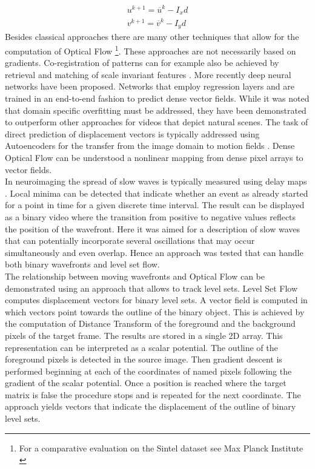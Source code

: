 \begin{equation}
  \begin{array}{l}
    u^{k+1}=\overline{u}^k - I_x d \\
    v^{k+1}=\overline{v}^k - I_y d
  \end{array}
\label{eqn:iterative_scheme}
\end{equation}
Besides classical approaches there are many other techniques that allow for the computation of Optical Flow \footnote{For a comparative evaluation on the Sintel dataset see Max Planck Institute \parencite*{mpi2020sintel}}. These approaches are not necessarily based on gradients. Co-registration of patterns can for example also be achieved by retrieval and matching of scale invariant features \parencite{zhang2014scale}. More recently deep neural networks have been proposed. Networks that employ regression layers and are trained in an end-to-end fashion to predict dense vector fields. While it was noted that domain specific overfitting must be addressed, they have been demonstrated to outperform other approaches for videos that depict natural scenes. The task of direct prediction of displacement vectors is typically addressed using Autoencoders for the transfer from the image domain to motion fields \parencite{hur2020optical}. Dense Optical Flow can be understood a nonlinear mapping from dense pixel arrays to vector fields. \\
In neuroimaging the spread of slow waves is typically measured using delay maps \parencite{celotto2020analysis}. Local minima can be detected that indicate whether an event as already started for a point in time for a given discrete time interval. The result can be displayed as a binary video where the transition from positive to negative values reflects the position of the wavefront. Here it was aimed for a description of slow waves that can potentially incorporate several oscillations that may occur simultaneously and even overlap. Hence an approach was tested that can handle both binary wavefronts and level set flow. \\
The relationship between moving wavefronts and Optical Flow can be demonstrated using an approach that allows to track level sets. Level Set Flow computes displacement vectors for binary level sets. A vector field is computed in which vectors point towards the outline of the binary object. This is achieved by the computation of Distance Transform of the foreground and the background pixels of the target frame. The results are stored in a single 2D array. This representation can be interpreted as a scalar potential. The outline of the foreground pixels is detected in the source image. Then gradient descent is performed beginning at each of the coordinates of named pixels following the gradient of the scalar potential. Once a position is reached where the target matrix is false the procedure stops and is repeated for the next coordinate. The approach yields vectors that indicate the displacement of the outline of binary level sets.\\
